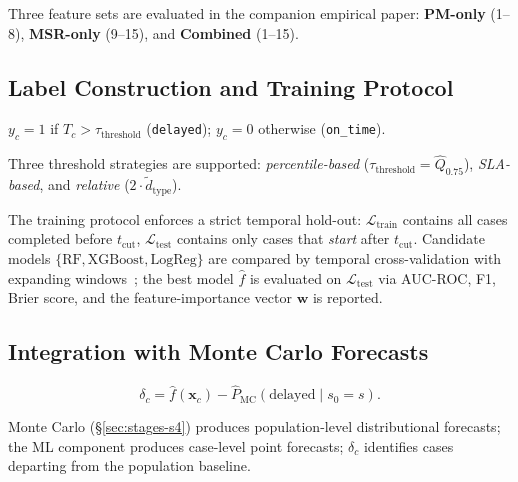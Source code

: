 Three feature sets are evaluated in the companion empirical paper:
\textbf{PM-only} (1--8), \textbf{MSR-only} (9--15), and
\textbf{Combined} (1--15).

\subsection{Label Construction and Training Protocol}
\label{sec:ml-training}

\begin{definition}
\label{def:label}
$y_c = 1$ if $T_c > \tau_{\text{threshold}}$
(\texttt{delayed}); $y_c = 0$ otherwise (\texttt{on\_time}).
\end{definition}

Three threshold strategies are supported:
\emph{percentile-based} ($\tau_{\text{threshold}} = \hat{Q}_{0.75}$),
\emph{SLA-based}, and \emph{relative}
($2 \cdot \tilde{d}_{\text{type}}$).

The training protocol enforces a strict temporal hold-out:
$\mathcal{L}_{\text{train}}$ contains all cases completed before
$t_{\text{cut}}$, $\mathcal{L}_{\text{test}}$ contains only cases that
\emph{start} after $t_{\text{cut}}$. Candidate models
$\{\text{RF}, \text{XGBoost}, \text{LogReg}\}$ are compared by
temporal cross-validation with expanding
windows~\cite{tashman2000out, hyndman2021forecasting}; the best model
$\hat{f}$ is evaluated on $\mathcal{L}_{\text{test}}$ via AUC-ROC,
F1, Brier score, and the feature-importance vector $\mathbf{w}$ is
reported.

\subsection{Integration with Monte Carlo Forecasts}
\label{sec:ml-integration}

\begin{definition}
\label{def:deviation}
\begin{equation}
\label{eq:deviation}
\delta_c = \hat{f}(\mathbf{x}_c) -
           \hat{P}_{\text{MC}}(\text{delayed} \mid s_0 = s).
\end{equation}
\end{definition}

Monte Carlo (§\ref{sec:stages-s4}) produces population-level
distributional forecasts; the ML component produces case-level point
forecasts; $\delta_c$ identifies cases departing from the population
baseline.
